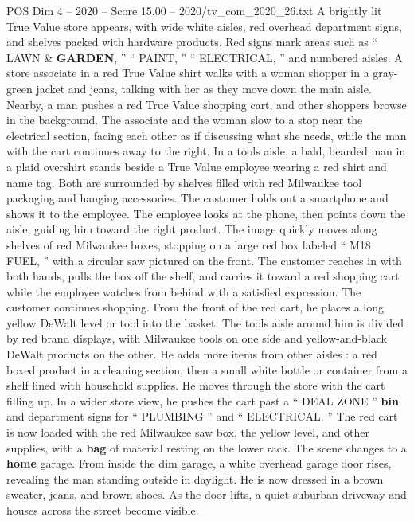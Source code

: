 \begin{textsample}{POS Dim 4 – 2020 – Score 15.00 – 2020/tv\_com\_2020\_26.txt}  \label{ex:f4_pos_016}
A brightly lit True Value store appears, with wide white aisles, red overhead department signs, and shelves packed with hardware products.
Red signs mark areas such as “ LAWN \& \textbf{GARDEN}, ” “ PAINT, ” “ ELECTRICAL, ” and numbered aisles.
A store associate in a red True Value shirt walks with a woman shopper in a gray-green jacket and jeans, talking with her as they move down the main aisle.
Nearby, a man pushes a red True Value shopping cart, and other shoppers browse in the background.
The associate and the woman slow to a stop near the electrical section, facing each other as if discussing what she needs, while the man with the cart continues away to the right.
In a tools aisle, a bald, bearded man in a plaid overshirt stands beside a True Value employee wearing a red shirt and name tag.
Both are surrounded by shelves filled with red Milwaukee tool packaging and hanging accessories.
The customer holds out a smartphone and shows it to the employee.
The employee looks at the phone, then points down the aisle, guiding him toward the right product.
The image quickly moves along shelves of red Milwaukee boxes, stopping on a large red box labeled “ M18 FUEL, ” with a circular saw pictured on the front.
The customer reaches in with both hands, pulls the box off the shelf, and carries it toward a red shopping cart while the employee watches from behind with a satisfied expression.
The customer continues shopping.
From the front of the red cart, he places a long yellow DeWalt level or tool into the basket.
The tools aisle around him is divided by red brand displays, with Milwaukee tools on one side and yellow-and-black DeWalt products on the other.
He adds more items from other aisles : a red boxed product in a cleaning section, then a small white bottle or container from a shelf lined with household supplies.
He moves through the store with the cart filling up.
In a wider store view, he pushes the cart past a “ DEAL ZONE ” \textbf{bin} and department signs for “ PLUMBING ” and “ ELECTRICAL. ” The red cart is now loaded with the red Milwaukee saw box, the yellow level, and other supplies, with a \textbf{bag} of material resting on the lower rack.
The scene changes to a \textbf{home} garage.
From inside the dim garage, a white overhead garage door rises, revealing the man standing outside in daylight.
He is now dressed in a brown sweater, jeans, and brown shoes.
As the door lifts, a quiet suburban driveway and houses across the street become visible.

\end{textsample}
